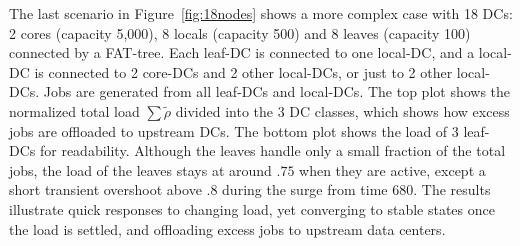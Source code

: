 The last scenario in Figure~\ref{fig:18nodes} shows a more complex case with
18 DCs: 2 cores (capacity 5,000), 8 locals (capacity 500) and 8 leaves
(capacity 100) connected by a FAT-tree.
Each leaf-DC is connected to one local-DC, and a local-DC is connected to
2 core-DCs and 2 other local-DCs, or just to 2 other local-DCs.
Jobs are generated from all leaf-DCs and local-DCs.
The top plot shows the normalized total load $\sum \tilde{\rho}$
divided into the 3 DC classes, which shows how excess jobs are
offloaded to upstream DCs.
The bottom plot shows the load of 3 leaf-DCs for readability.
Although the leaves handle only a small fraction of the total jobs,
the load of the leaves stays at around $.75$ when they are
active, except a short transient overshoot above $.8$ during the
surge from time 680.
The results illustrate quick responses to changing load,
yet converging to stable states once the load is settled,
and offloading excess jobs to upstream data centers.

